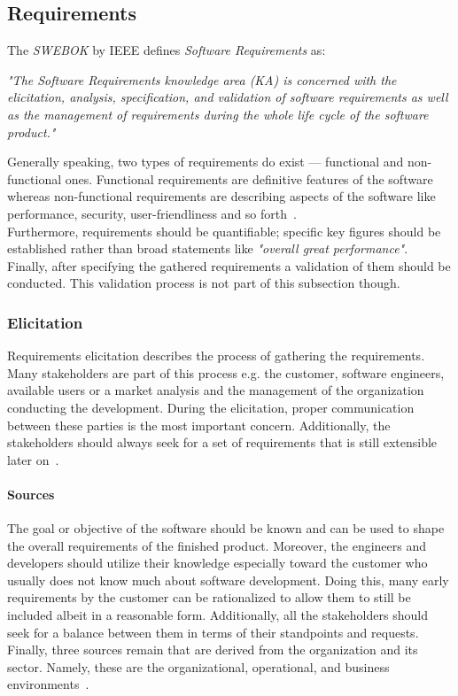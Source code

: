 \documentclass[12pt,a4paper,twoside]{report}
\begin{document}
\subsection{Requirements} \label{subsect:requirements}

The \textit{SWEBOK} by IEEE defines \textit{Software Requirements} as:
\begin{displayquote}
\emph{"The Software Requirements knowledge area (KA) is concerned with
the elicitation, analysis, specification, and validation of software requirements
as well as the management of requirements during the whole
life cycle of the software product."}~\cite{swebok}
\end{displayquote}
Generally speaking, two types of requirements do exist --- functional and non-functional ones.
Functional requirements are definitive features of the software whereas non-functional
requirements are describing aspects of the software like performance, security,
user-friendliness and so forth~\cite{sommerville-se}.\\
Furthermore, requirements should be quantifiable; specific key figures should be established
rather than broad statements like \textit{"overall great performance"}.\\
Finally, after specifying the gathered requirements a validation of them should be conducted.
This validation process is not part of this subsection though.


\subsubsection{Elicitation}
Requirements elicitation describes the process of gathering the requirements.
Many stakeholders are part of this process e.g. the customer, software engineers,
available users or a market analysis and the management of the organization conducting
the development.
During the elicitation, proper communication between these parties is the most important
concern. Additionally, the stakeholders should always seek for a set of
requirements that is still extensible later on~\cite{swebok}.

\paragraph{Sources}
The goal or objective of the software should be known and can be used to
shape the overall requirements of the finished product.
Moreover, the engineers and developers should utilize their knowledge especially
toward the customer who usually does not know much about software development.
Doing this, many early requirements by the customer can be rationalized to allow
them to still be included albeit in a reasonable form.
Additionally, all the stakeholders should seek for a balance between them in
terms of their standpoints and requests.\\
Finally, three sources remain that are derived from the organization and its sector.
Namely, these are the organizational, operational, and business environments~\cite{swebok}.
\end{document}
